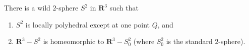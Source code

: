 There is a wild $2$-sphere $S^2$ in $\mathbf{R}^3$ such that
\begin{enumerate}
  \item[(1)] $S^2$ is locally polyhedral except at one point $Q$, and
  \item[(2)] $\mathbf{R}^3 - S^2$ is homeomorphic to $\mathbf{R}^3 - S^2_0$
            (where $S^2_0$ is the standard $2$-sphere).
\end{enumerate}
